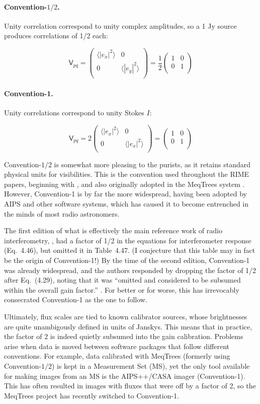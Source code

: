 \documentclass{aa}
\newcommand{\matrixtt}[4]{\left( \begin{array}{cc}#1&#2\\#3&#4\\\end{array} \right)}
\newcommand{\coh}[2]{\mathsf{{#1}}_{{#2}}}
\begin{document}
\paragraph{Convention-$\scriptstyle 1/2$.} Unity correlation correspond to unity complex amplitudes, so a 1 Jy source produces correlations of 1/2 each: 

\[
\coh{V}{pq} = \matrixtt{\langle |e_x|^2\rangle }{0}{0}{\langle |e_y|^2\rangle } = \frac{1}{2}\matrixtt{1}{0}{0}{1}
\]

\paragraph{Convention-1.} Unity correlations correspond to unity Stokes $I$:

\[
\coh{V}{pq} = 2\matrixtt{\langle |e_x|^2\rangle }{0}{0}{\langle |e_x|^2\rangle } = \matrixtt{1}{0}{0}{1}
\]

Convention-$\scriptstyle 1/2$ is somewhat more pleasing to the purists, as it retains standard physical units for visibilities. This is the convention used throughout the RIME papers, beginning with \citet{ME1}, and also originally adopted in the MeqTrees system \citep{meqtrees}. However, Convention-1 is by far the more widespread, having been adopted by AIPS and other software systems, which has caused it to become entrenched in the minds of most radio astronomers.

The first edition of what is effectively the main reference work of radio interferometry, \citet*{tms1}, had a factor of 1/2 in the equations for interferometer response (Eq.~4.46), but omitted it in Table~4.47. (I conjecture that this table may in fact be the origin of Convention-1!) By the time of the second edition, Convention-1 was already widespread, and the authors responded by dropping the factor of 1/2 after Eq.~(4.29), noting that it was ``omitted and considered to be subsumed within the overall gain factor.'' \citep[see p. 102]{tms}. For better or for worse, this has irrevocably consecrated Convention-1 as the one to follow.

Ultimately, flux scales are tied to known calibrator sources, whose brightnesses are quite unambigously defined in units of Janskys. This means that in practice, the factor of 2 is indeed quietly subsumed into the gain calibration. Problems arise when data is moved between software packages that follow different conventions. For example, data calibrated with MeqTrees (formerly using  Convention-$\scriptstyle 1/2$) is kept in a Measurement Set (MS), yet the only tool available for making images from an MS is the AIPS++/CASA imager (Convention-1). This has often resulted in images with fluxes that were off by a factor of 2, so the MeqTrees project has recently switched to Convention-1.
\end{document}
